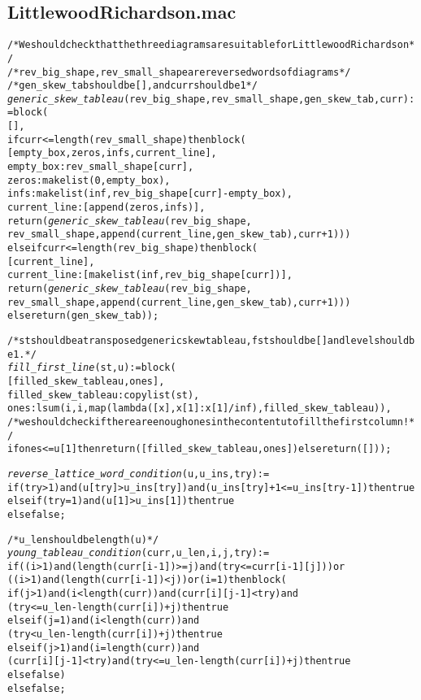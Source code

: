 \subsection*{LittlewoodRichardson.mac}
\begin{alltt}
\footnotesize
/* We should check that the three diagrams are suitable for Littlewood Richardson */
/* rev\_big\_shape, rev\_small\_shape are reversed words of diagrams */
/* gen\_skew\_tab should be [], and curr should be 1 */
\emph{generic\_skew\_tableau} (rev\_big\_shape, rev\_small\_shape, gen\_skew\_tab, curr) := block (
  [],
  if curr <= length (rev\_small\_shape) then block (
    [empty\_box,zeros,infs,current\_line],
    empty\_box : rev\_small\_shape[curr],
    zeros : makelist (0, empty\_box),
    infs : makelist (inf, rev\_big\_shape[curr] - empty\_box),
    current\_line : [append (zeros, infs)],
    return (\emph{generic\_skew\_tableau} (rev\_big\_shape, 
      rev\_small\_shape, append (current\_line, gen\_skew\_tab), curr + 1)))
  else if curr <= length (rev\_big\_shape) then block (
    [current\_line],
    current\_line : [makelist (inf, rev\_big\_shape[curr])],
    return (\emph{generic\_skew\_tableau} (rev\_big\_shape,
      rev\_small\_shape, append (current\_line, gen\_skew\_tab), curr + 1)))
  else return (gen\_skew\_tab));

/* st should be a transposed generic skew tableau, fst should be [] and level should be 1. */
\emph{fill\_first\_line} (st, u) := block (
  [filled\_skew\_tableau, ones],
  filled\_skew\_tableau : copylist (st),
  ones : lsum (i, i, map (lambda ([x], x[1] : x[1]/inf), filled\_skew\_tableau)),
  /* we should check if there are enough ones in the content u to fill the first column! */
  if ones <= u[1] then return ([filled\_skew\_tableau, ones]) else return ([]));

\emph{reverse\_lattice\_word\_condition} (u, u\_ins, try) :=
if (try > 1) and (u[try] > u\_ins[try]) and (u\_ins[try] + 1 <= u\_ins [try-1]) then true
else if (try = 1) and (u[1] > u\_ins[1]) then true
else false;

/* u\_len should be length (u) */
\emph{young\_tableau\_condition} (curr, u\_len, i, j, try) :=
if ((i>1) and (length(curr[i-1])>=j) and (try<=curr[i-1][j])) or 
   ((i>1) and (length(curr[i-1])<j)) or (i=1) then block (
  if (j>1) and (i<length(curr)) and (curr[i][j-1]<try) and 
     (try<=u_len-length(curr[i])+j) then true
  else if (j=1) and (i<length(curr)) and
          (try<u_len-length(curr[i])+j) then true
  else if (j>1) and (i=length(curr)) and
          (curr[i][j-1]<try) and (try<=u\_len-length(curr[i])+j) then true
  else false)
else false;


\end{alltt}
